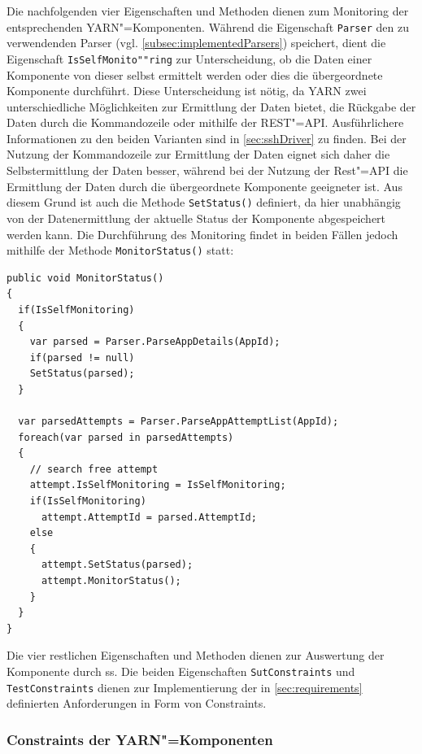Die nachfolgenden vier Eigenschaften und Methoden dienen zum Monitoring der entsprechenden \ac{YARN}"=Komponenten.
Während die Eigenschaft \texttt{Parser} den zu verwendenden Parser (vgl. \cref{subsec:implementedParsers}) speichert, dient die Eigenschaft \texttt{IsSelfMonito""ring} zur Unterscheidung, ob die Daten einer Komponente von dieser selbst ermittelt werden oder dies die übergeordnete Komponente durchführt.
Diese Unterscheidung ist nötig, da \ac{YARN} zwei unterschiedliche Möglichkeiten zur Ermittlung der Daten bietet, die Rückgabe der Daten durch die Kommandozeile oder mithilfe der REST"=API.
Ausführlichere Informationen zu den beiden Varianten sind in \cref{sec:sshDriver} zu finden.
Bei der Nutzung der Kommandozeile zur Ermittlung der Daten eignet sich daher die Selbstermittlung der Daten besser, während bei der Nutzung der Rest"=API die Ermittlung der Daten durch die übergeordnete Komponente geeigneter ist.
Aus diesem Grund ist auch die Methode \texttt{SetStatus()} definiert, da hier unabhängig von der Datenermittlung der aktuelle Status der Komponente abgespeichert werden kann.
Die Durchführung des Monitoring findet in beiden Fällen jedoch mithilfe der Methode \texttt{MonitorStatus()} statt:

\begin{lstlisting}[label=lst:monitorAppStatus,style=cs,
caption={[Implementierung der Methode MonitorStatus() in der Klasse YarnApp]
    Implementierung der Methode \texttt{MonitorStatus()} in der Klasse \texttt{YarnApp} (gekürzt).
    Das Monitoring der anderen Komponenten erfolgt analog hierzu.}]
public void MonitorStatus()
{
  if(IsSelfMonitoring)
  {
    var parsed = Parser.ParseAppDetails(AppId);
    if(parsed != null)
    SetStatus(parsed);
  }
  
  var parsedAttempts = Parser.ParseAppAttemptList(AppId);
  foreach(var parsed in parsedAttempts)
  {
    // search free attempt
    attempt.IsSelfMonitoring = IsSelfMonitoring;
    if(IsSelfMonitoring)
      attempt.AttemptId = parsed.AttemptId;
    else
    {
      attempt.SetStatus(parsed);
      attempt.MonitorStatus();
    }
  }
}
\end{lstlisting}

Die vier restlichen Eigenschaften und Methoden dienen zur Auswertung der Komponente durch \ac{ss}.
Die beiden Eigenschaften \texttt{SutConstraints} und \texttt{TestConstraints} dienen zur Implementierung der in \cref{sec:requirements} definierten Anforderungen in Form von Constraints.

\subsubsection{Constraints der \acs{YARN}"=Komponenten}
\label{subsubsec:yarnComponentConstraints}

